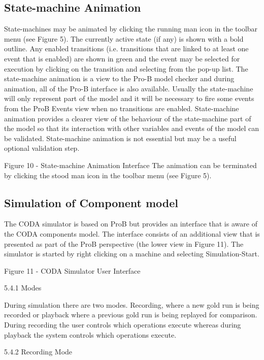\subsection{State-machine Animation}


State-machines may be animated by clicking the running man icon in the toolbar menu (see Figure 5). The currently active state (if any) is shown with a bold outline. Any enabled transitions (i.e. transitions that are linked to at least one event that is enabled) are shown in green and the event may be selected for execution by clicking on the transition and selecting from the pop-up list. The state-machine animation is a view to the Pro-B model checker and during animation, all of the Pro-B interface is also available. Usually the state-machine will only represent part of the model and it will be necessary to fire some events from the ProB Events view when no transitions are enabled. State-machine animation provides a clearer view of the behaviour of the state-machine part of the model so that its interaction with other variables and events of the model can be validated. State-machine animation is not essential but may be a useful optional validation step.
 

Figure 10 - State-machine Animation Interface
The animation can be terminated by clicking the stood man icon in the toolbar menu (see Figure 5).


\subsection{Simulation of Component model}
The CODA simulator is based on ProB but provides an interface that is aware of the CODA components model. The interface consists of an additional view that is presented as part of the ProB perspective (the lower view in Figure 11). The simulator is started by right clicking on a machine and selecting Simulation-Start. 
 

Figure 11 - CODA Simulator User Interface


5.4.1	Modes

During simulation there are two modes. Recording, where a new gold run is being recorded or playback where a previous gold run is being replayed for comparison. During recording the user controls which operations execute whereas during playback the system controls which operations execute. 

5.4.2	Recording Mode

